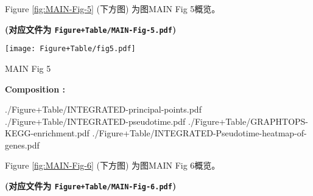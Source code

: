 \documentclass[
]{article}
\begin{document}
\begin{center}\vspace{1.5cm}\end{center}

Figure \ref{fig:MAIN-Fig-5} (下方图) 为图MAIN Fig 5概览。

\textbf{(对应文件为 \texttt{Figure+Table/MAIN-Fig-5.pdf})}

\def\@captype{figure}
\begin{center}
\texttt{[image: Figure+Table/fig5.pdf]}
\caption{MAIN Fig 5}\label{fig:MAIN-Fig-5}
\end{center}
\begin{center}\begin{tcolorbox}[colback=gray!10, colframe=gray!50, width=0.9\linewidth, arc=1mm, boxrule=0.5pt]
\textbf{
Composition
:}

\vspace{0.5em}

    ./Figure+Table/INTEGRATED-principal-points.pdf \newline
./Figure+Table/INTEGRATED-pseudotime.pdf \newline
./Figure+Table/GRAPHTOPS-KEGG-enrichment.pdf \newline
./Figure+Table/INTEGRATED-Pseudotime-heatmap-of-genes.pdf

\vspace{2em}
\end{tcolorbox}
\end{center}

\begin{center}\vspace{1.5cm}\end{center}

\begin{center}\vspace{1.5cm}\end{center}

Figure \ref{fig:MAIN-Fig-6} (下方图) 为图MAIN Fig 6概览。

\textbf{(对应文件为 \texttt{Figure+Table/MAIN-Fig-6.pdf})}
\end{document}
